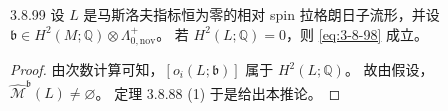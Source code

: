 \begin{corollary}{3.8.99}\label{cor:3-8-99}
设 $L$ 是马斯洛夫指标恒为零的相对 spin 拉格朗日子流形，并设
$\mathfrak b\in H^2(M;\mathbb Q)\otimes\Lambda^+_{0,\mathrm{nov}}$。
若 $H^2(L;\mathbb Q)=0$，则 \eqref{eq:3-8-98} 成立。
\end{corollary}

\begin{proof}
由次数计算可知，$[o_i(L;\mathfrak b)]$ 属于
$H^2(L;\mathbb Q)$。
故由假设，$\widehat{\mathcal M}^{\mathfrak b}(L)\ne\varnothing$。
定理 3.8.88 (1) 于是给出本推论。
\end{proof}
